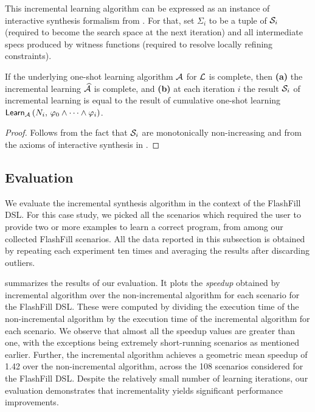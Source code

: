 This incremental learning algorithm can be expressed as an instance of interactive synthesis formalism from
.
For that, set $\Sigma_i$ to be a tuple of $\mathcal{S}_i$ (required to become the search space at the next
iteration) and all intermediate specs produced by witness functions (required to resolve locally refining constraints).

\begin{theorem}
    If the underlying one-shot learning algorithm $\mathcal{A}$ for $\mathcal{L}$ is complete, then
    \textbf{(a)} the incremental learning $\widehat{\mathcal{A}}$ is complete, and
    \textbf{(b)} at each iteration $i$ the result $\mathcal{S}_i$ of incremental learning is equal to the result of
    cumulative one-shot learning $\mathsf{Learn}_{\mathcal{A}}\left(N_i,\, \varphi_0 \wedge \dots \wedge
    \varphi_i\right)$.
    \label{th:incremental:complete}
\end{theorem}
\begin{proof}
    Follows from the fact that $\mathcal{S}_i$ are monotonically non-increasing and from the axioms of interactive
    synthesis in .
\end{proof}

\subsection{Evaluation}
We evaluate the incremental synthesis algorithm in the context of the FlashFill DSL.
For this case study, we picked all the scenarios which required the user to provide two or more examples to learn a
correct program, from among our collected FlashFill scenarios.
All the data reported in this subsection is obtained by repeating each experiment ten times and averaging the results
after discarding outliers.

 summarizes the results of our evaluation.
It plots the \emph{speedup} obtained by incremental algorithm over the non-incremental algorithm for each scenario for
the FlashFill DSL.
These were computed by dividing the execution time of the non-incremental algorithm by the execution time of the
incremental algorithm for each scenario.
We observe that almost all the speedup values are greater than one, with the exceptions being extremely short-running
scenarios as mentioned earlier.
Further, the incremental algorithm achieves a geometric mean speedup of 1.42 over the non-incremental algorithm, across
the 108 scenarios considered for the FlashFill DSL.
Despite the relatively small number of learning iterations, our evaluation demonstrates that incrementality yields
significant performance improvements.

